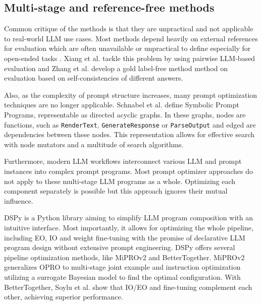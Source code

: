 \subsection{Multi-stage and reference-free methods}

Common critique of the methods is that they are unpractical and not applicable to real-world LLM use cases.
Most methods depend heavily on external references for evaluation which are often unavailable or 
unpractical to define especially for open-ended tasks \cite{xiang2025selfsupervisedpromptoptimization}.
Xiang et al.\cite{xiang2025selfsupervisedpromptoptimization} tackle this problem by using pairwise LLM-based evaluation
and Zhang et al.\cite{zhang2024glapegoldlabelagnosticprompt} develop a gold label-free method method on evaluation based
on self-consistencies of different answers.

Also, as the complexity of prompt structure increases, many prompt optimization techniques are no longer applicable\cite{schnabel2024symbolicpromptprogramsearch}.
Schnabel et al.\cite{schnabel2024symbolicpromptprogramsearch} define Symbolic Prompt Programs, representable
as directed acyclic graphs. In these graphs, nodes are functions, such as \texttt{RenderText}, \texttt{GenerateResponse} or \texttt{ParseOutput} 
and edged are dependencies between these nodes. This representation allows for effective search with node mutators
and a multitude of search algorithms.

Furthermore, modern LLM workflows interconnect various LLM and prompt instances into complex prompt programs.
Most prompt optimizer approaches do not apply to these multi-stage LLM programs\cite{opsahlong2024optimizinginstructionsdemonstrationsmultistage}
as a whole. Optimizing each component separately is possible but this approach ignores their mutual influence.

DSPy\cite{khattab2023dspycompilingdeclarativelanguage} is a Python library aiming to simplify LLM program composition with 
an intuitive interface. Most importantly, it allows for optimizing the whole pipeline, including EO, IO and weight fine-tuning
with the promise of declarative LLM program design without extensive prompt engineering. DSPy offers several pipeline optimization
methods, like MiPROv2\cite{opsahlong2024optimizinginstructionsdemonstrationsmultistage} and BetterTogether\cite{soylu2024finetuningpromptoptimizationgreat}.
MiPROv2 generalizes OPRO\cite{yang2024largelanguagemodelsoptimizers} to multi-stage joint example and instruction optimization
utilizing a surrogate Bayesian model to find the optimal configuration. With BetterTogether, Soylu et al. show that IO/EO and fine-tuning
complement each other, achieving superior performance.


